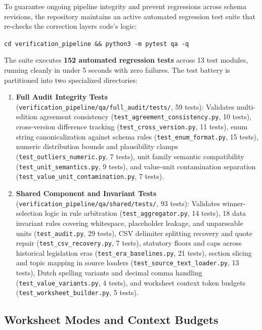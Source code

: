 To guarantee ongoing pipeline integrity and prevent regressions across schema revisions, the repository maintains an active automated regression test suite that re-checks the correction layers code's logic:
\begin{center}
\texttt{cd verification\_pipeline \&\& python3 -m pytest qa -q}
\end{center}
The suite executes \textbf{152 automated regression tests} across 13 test modules, running cleanly in under 5 seconds with zero failures. The test battery is partitioned into two specialized directories:
\begin{enumerate}[leftmargin=1.5em]
  \item \textbf{Full Audit Integrity Tests} (\nolinkurl{verification_pipeline/qa/full_audit/tests/}, 59 tests): Validates multi-edition agreement consistency (\texttt{test\_agreement\_consistency.py}, 10 tests), cross-version difference tracking (\texttt{test\_cross\_version.py}, 11 tests), enum string canonicalization against schema rules (\texttt{test\_enum\_format.py}, 15 tests), numeric distribution bounds and plausibility clamps (\texttt{test\_outliers\_numeric.py}, 7 tests), unit family semantic compatibility (\texttt{test\_unit\_semantics.py}, 9 tests), and value-unit contamination separation (\texttt{test\_value\_unit\_contamination.py}, 7 tests).
  \item \textbf{Shared Component and Invariant Tests} (\nolinkurl{verification_pipeline/qa/shared/tests/}, 93 tests): Validates winner-selection logic in rule arbitration (\texttt{test\_aggregator.py}, 14 tests), 18 data invariant rules covering whitespace, placeholder leakage, and unparseable units (\texttt{test\_audit.py}, 29 tests), CSV delimiter splitting recovery and quote repair (\texttt{test\_csv\_recovery.py}, 7 tests), statutory floors and caps across historical legislation eras (\texttt{test\_era\_baselines.py}, 21 tests), section slicing and topic mapping in source loaders (\texttt{test\_source\_text\_loader.py}, 13 tests), Dutch spelling variants and decimal comma handling (\texttt{test\_value\_variants.py}, 4 tests), and worksheet context token budgets (\texttt{test\_worksheet\_builder.py}, 5 tests).
\end{enumerate}

\subsection{Worksheet Modes and Context Budgets}

